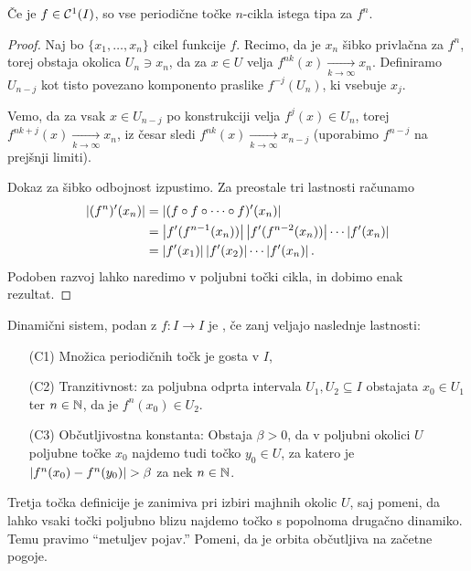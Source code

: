 \begin{izrek}
  Če je $f \in \mathcal{C}^{1}(I)$, so vse periodične točke $n$-cikla istega tipa za
  $f^n$.
\end{izrek}

\begin{proof}
  Naj bo $\{x_1, \ldots, x_n\}$ cikel funkcije $f$.
  Recimo, da je $x_n$ šibko privlačna za $f^n$, torej obstaja okolica $U_n \ni
  x_n$, da za $x \in U$ velja $f^{nk}(x) \xrightarrow[k \to \infty]{} x_n$.
  Definiramo $U_{n-j}$ kot tisto povezano komponento praslike $f^{-j}(U_n)$, ki
  vsebuje $x_j$.

  Vemo, da za vsak $x \in U_{n-j}$ po konstrukciji velja $f^j(x) \in U_n$, torej
  $f^{nk+j}(x) \xrightarrow[k \to \infty]{} x_n$, iz česar sledi $f^{nk}(x)
  \xrightarrow[k \to \infty]{} x_{n-j}$ (uporabimo $f^{n-j}$ na prejšnji
  limiti).

  Dokaz za šibko odbojnost izpustimo.
  Za preostale tri lastnosti računamo
  \begin{align*}
	\left| (f^n)'(x_n) \right|
	&= \left| (f \circ f \circ \cdots \circ f)'(x_n) \right| \\
	&= \left| f'(f^{n-1}(x_n)) \right| \left| f'(f^{n-2}(x_n)) \right| \cdots \left| f'(x_n) \right| \\
	&= \left| f'(x_1) \right| \left| f'(x_2) \right| \cdots \left| f'(x_n) \right|.
  \end{align*}
  Podoben razvoj lahko naredimo v poljubni točki cikla, in dobimo enak rezultat.
\end{proof}


\begin{definicija}[Devaney]
  Dinamični sistem, podan z $f: I \to I$ je , če zanj veljajo
  naslednje lastnosti:
  \begin{enumerate}
  \item[(C1)] Množica periodičnih točk je gosta v $I$,
  \item[(C2)] Tranzitivnost: za poljubna odprta intervala $U_1, U_2 \subseteq I$
	obstajata $x_0 \in U_1$ ter $n \in \mathbb{N}$, da je $f^n(x_0) \in U_2$.
  \item[(C3)] Občutljivostna konstanta: Obstaja $\beta > 0$, da v poljubni
	okolici $U$ poljubne točke $x_0$ najdemo tudi točko $y_0 \in U$, za katero
	je $\left| f^n(x_0) - f^n(y_0) \right| > \beta$ za nek $n \in \mathbb{N}$.
  \end{enumerate}
\end{definicija}

\begin{opomba}
  Tretja točka definicije je zanimiva pri izbiri majhnih okolic $U$, saj pomeni,
  da lahko vsaki točki poljubno blizu najdemo točko s popolnoma drugačno
  dinamiko.
  Temu pravimo \enquote{metuljev pojav.}
  Pomeni, da je orbita občutljiva na začetne pogoje.
\end{opomba}


